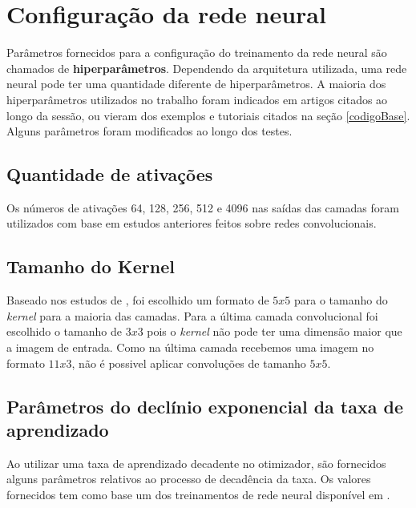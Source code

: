 \section{Configuração da rede neural}

Parâmetros fornecidos para a configuração do treinamento da rede
neural são chamados de {\bf hiperparâmetros}. Dependendo da
arquitetura utilizada, uma rede neural pode ter uma quantidade
diferente de hiperparâmetros. A maioria dos hiperparâmetros utilizados
no trabalho foram indicados em artigos citados ao longo da sessão, ou
vieram dos exemplos e tutoriais citados na seção
\ref{codigoBase}. Alguns parâmetros foram modificados ao longo dos
testes.

\subsection{Quantidade de ativações}

Os números de ativações 64, 128, 256, 512 e 4096 nas saídas das
camadas foram utilizados com base em estudos anteriores feitos sobre
redes convolucionais\cite{Krizhevsky}.

\subsection{Tamanho do Kernel}

Baseado nos estudos de \cite{Goodfellow}, foi escolhido um formato
de $5x5$ para o tamanho do \textit{kernel} para a maioria das
camadas. Para a última camada convolucional foi escolhido o tamanho
de $3x3$ pois o \textit{kernel} não pode ter uma dimensão maior que
a imagem de entrada. Como na última camada recebemos uma imagem no
formato $11x3$, não é possivel aplicar convoluções de tamanho $5x5$.

\subsection{Parâmetros do declínio exponencial da taxa de aprendizado}

Ao utilizar uma taxa de aprendizado decadente no otimizador, são
fornecidos alguns parâmetros relativos ao processo de decadência da
taxa. Os valores fornecidos tem como base um dos treinamentos de rede
neural disponível em \cite{tensorCode}.

